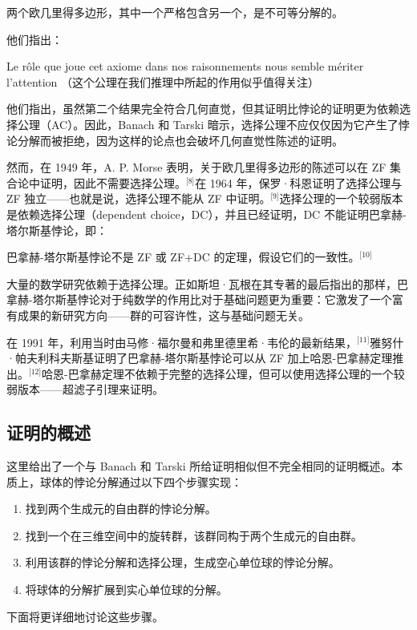 两个欧几里得多边形，其中一个严格包含另一个，是不可等分解的。

他们指出：

Le rôle que joue cet axiome dans nos raisonnements nous semble mériter l'attention  
（这个公理在我们推理中所起的作用似乎值得关注）

他们指出，虽然第二个结果完全符合几何直觉，但其证明比悖论的证明更为依赖选择公理（AC）。因此，Banach 和 Tarski 暗示，选择公理不应仅仅因为它产生了悖论分解而被拒绝，因为这样的论点也会破坏几何直觉性陈述的证明。

然而，在 1949 年，A. P. Morse 表明，关于欧几里得多边形的陈述可以在 ZF 集合论中证明，因此不需要选择公理。\(^\text{[8]}\)在 1964 年，保罗·科恩证明了选择公理与 ZF 独立——也就是说，选择公理不能从 ZF 中证明。\(^\text{[9]}\)选择公理的一个较弱版本是依赖选择公理（dependent choice，DC），并且已经证明，DC 不能证明巴拿赫-塔尔斯基悖论，即：

巴拿赫-塔尔斯基悖论不是 ZF 或 ZF+DC 的定理，假设它们的一致性。\(^\text{[10]}\)

大量的数学研究依赖于选择公理。正如斯坦·瓦根在其专著的最后指出的那样，巴拿赫-塔尔斯基悖论对于纯数学的作用比对于基础问题更为重要：它激发了一个富有成果的新研究方向——群的可容许性，这与基础问题无关。

在 1991 年，利用当时由马修·福尔曼和弗里德里希·韦伦的最新结果，\(^\text{[11]}\)雅努什·帕夫利科夫斯基证明了巴拿赫-塔尔斯基悖论可以从 ZF 加上哈恩-巴拿赫定理推出。\(^\text{[12]}\)哈恩-巴拿赫定理不依赖于完整的选择公理，但可以使用选择公理的一个较弱版本——超滤子引理来证明。
\subsection{证明的概述}  
这里给出了一个与 Banach 和 Tarski 所给证明相似但不完全相同的证明概述。本质上，球体的悖论分解通过以下四个步骤实现：
\begin{enumerate}
\item 找到两个生成元的自由群的悖论分解。
\item 找到一个在三维空间中的旋转群，该群同构于两个生成元的自由群。
\item 利用该群的悖论分解和选择公理，生成空心单位球的悖论分解。
\item 将球体的分解扩展到实心单位球的分解。
\end{enumerate}
下面将更详细地讨论这些步骤。
